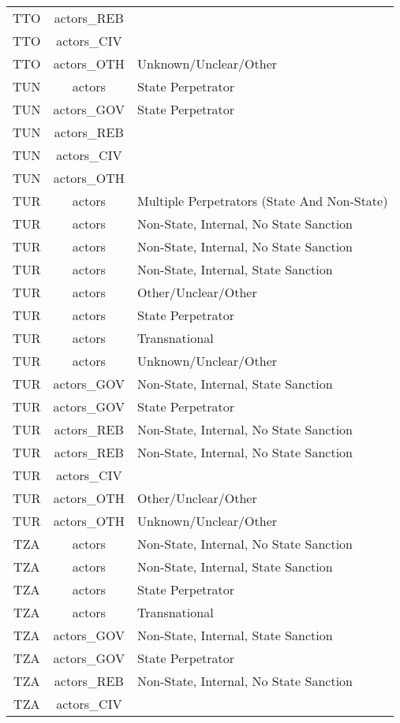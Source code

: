 \documentclass[12pt]{article}
\begin{document}
\begin{center}
\begin{longtable}{|c|c|p{10cm}|}
  TTO & actors\_REB &  \\ 
  TTO & actors\_CIV &  \\ 
  TTO & actors\_OTH & Unknown/Unclear/Other \\ 
  TUN & actors & State Perpetrator \\ 
  TUN & actors\_GOV & State Perpetrator \\ 
  TUN & actors\_REB &  \\ 
  TUN & actors\_CIV &  \\ 
  TUN & actors\_OTH &  \\ 
  TUR & actors & Multiple Perpetrators (State And Non-State) \\ 
  TUR & actors & Non-State, Internal, No State Sanction \\ 
  TUR & actors & Non-State, Internal, No State Sanction \\ 
  TUR & actors & Non-State, Internal, State Sanction \\ 
  TUR & actors & Other/Unclear/Other \\ 
  TUR & actors & State Perpetrator \\ 
  TUR & actors & Transnational \\ 
  TUR & actors & Unknown/Unclear/Other \\ 
  TUR & actors\_GOV & Non-State, Internal, State Sanction \\ 
  TUR & actors\_GOV & State Perpetrator \\ 
  TUR & actors\_REB & Non-State, Internal, No State Sanction \\ 
  TUR & actors\_REB & Non-State, Internal, No State Sanction \\ 
  TUR & actors\_CIV &  \\ 
  TUR & actors\_OTH & Other/Unclear/Other \\ 
  TUR & actors\_OTH & Unknown/Unclear/Other \\ 
  TZA & actors & Non-State, Internal, No State Sanction \\ 
  TZA & actors & Non-State, Internal, State Sanction \\ 
  TZA & actors & State Perpetrator \\ 
  TZA & actors & Transnational \\ 
  TZA & actors\_GOV & Non-State, Internal, State Sanction \\ 
  TZA & actors\_GOV & State Perpetrator \\ 
  TZA & actors\_REB & Non-State, Internal, No State Sanction \\ 
  TZA & actors\_CIV &  \\ 

\end{longtable}
\end{center}
\end{document}
